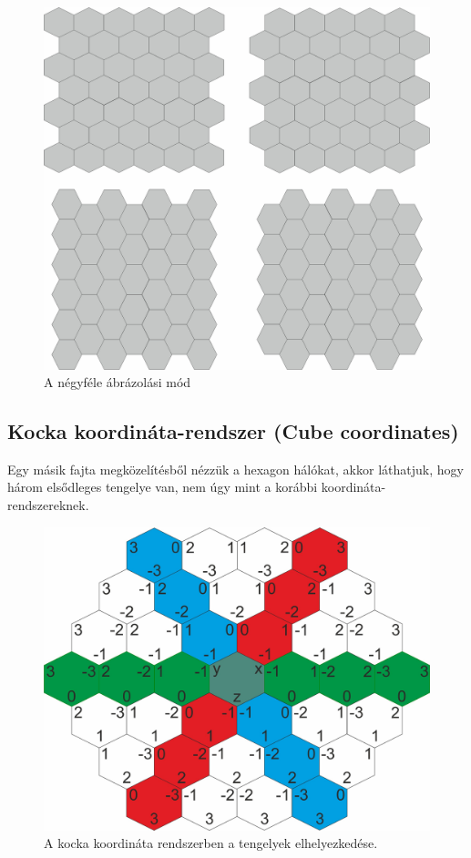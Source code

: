 \begin{figure}[h!]
\centering
\includegraphics[scale=0.2]{kepek/OffsetFour.jpg}
\caption{A négyféle ábrázolási mód}
\label{fig:OffsetFour}
\end{figure}

\subsection{Kocka koordináta-rendszer (Cube coordinates)}

Egy másik fajta megközelítésből nézzük a hexagon hálókat, akkor láthatjuk, hogy három elsődleges tengelye van, nem úgy mint a korábbi koordináta-rendszereknek. 

\begin{figure}[h!]
\centering
\includegraphics[scale=0.2]{kepek/CubeCoord.jpg}
\caption{A kocka koordináta rendszerben a tengelyek elhelyezkedése.}
\label{fig:CubeCoord}
\end{figure}

